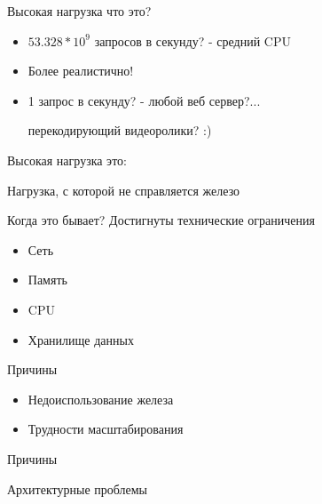 \documentclass[aspectratio=169]{beamer}
\begin{document}
\begin{frame}{Высокая нагрузка что это?}
    \begin{itemize}
        
        \pause
        \item $53.328 * 10^9$  запросов в секунду?
            \pause
            {\small - средний CPU}

        \pause
        \item Более реалистично!

        \pause
        \item 1 запрос в секунду?
            \pause
            - любой веб сервер?...
            \pause
            \par {\small перекодирующий видеоролики? :)}
    \end{itemize}
\end{frame}

\begin{frame}{Высокая нагрузка это:}
    \pause
    \begin{center}
        {\huge Нагрузка, с которой не справляется железо}
    \end{center}
\end{frame}

\begin{frame}{Когда это бывает?}
    \pause
    {\large Достигнуты технические ограничения}
    \begin{itemize}
        \pause
        \item Сеть
        
        \pause\item Память
        \pause\item CPU
        \pause\item Хранилище данных
    \end{itemize}
\end{frame}

\begin{frame}{Причины}
    \begin{itemize}
        \pause
        \item Недоиспользование железа

        \pause
        \item Трудности масштабирования
    \end{itemize}

\end{frame}

\begin{frame}{Причины}
    \begin{block}
        {\huge Архитектурные проблемы}
    \end{block}
\end{frame}
\end{document}
